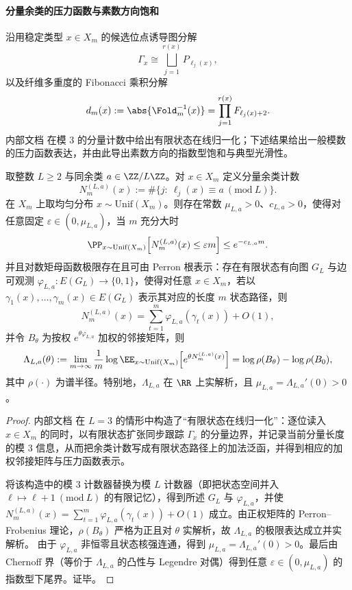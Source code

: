 \paragraph{分量余类的压力函数与素数方向饱和}
沿用稳定类型 \(x\in X_m\) 的候选位点诱导图分解
\[
\Gamma_x \cong \bigsqcup_{j=1}^{r(x)} P_{\ell_j(x)},
\]
以及纤维多重度的 Fibonacci 乘积分解
\[
d_m(x):=\abs{\Fold_m^{-1}(x)}=\prod_{j=1}^{r(x)} F_{\ell_j(x)+2}.
\]
内部文档 \cite{Internal2026FoldComponentResiduePressurePAdicSaturation20260302} 在模 \(3\) 的分量计数中给出有限状态在线归一化；下述结果给出一般模数的压力函数表达，并由此导出素数方向的指数型饱和与典型光滑性。

\begin{theorem}\label{thm:fold-component-residue-pressure-ld}
取整数 \(L\ge 2\) 与同余类 \(a\in \ZZ/L\ZZ\)。对 \(x\in X_m\) 定义分量余类计数
\[
N_{m}^{(L,a)}(x):=\#\{j:\ \ell_j(x)\equiv a\ (\mathrm{mod}\ L)\}.
\]
在 \(X_m\) 上取均匀分布 \(x\sim\mathrm{Unif}(X_m)\)。则存在常数 \(\mu_{L,a}>0\)、\(c_{L,a}>0\)，使得对任意固定 \(\varepsilon\in(0,\mu_{L,a})\)，当 \(m\) 充分大时
\[
\PP_{x\sim\mathrm{Unif}(X_m)}\!\left[N_{m}^{(L,a)}(x)\le \varepsilon m\right]\le e^{-c_{L,a}m}.
\]
并且对数矩母函数极限存在且可由 Perron 根表示：存在有限状态有向图 \(G_{L}\) 与边可观测 \(\varphi_{L,a}:E(G_L)\to\{0,1\}\)，使得对任意 \(x\in X_m\)，若以 \(\gamma_1(x),\dots,\gamma_m(x)\in E(G_L)\) 表示其对应的长度 \(m\) 状态路径，则
\[
N_{m}^{(L,a)}(x)=\sum_{t=1}^{m}\varphi_{L,a}(\gamma_t(x))+O(1),
\]
并令 \(B_{\theta}\) 为按权 \(e^{\theta\varphi_{L,a}}\) 加权的邻接矩阵，则
\[
\Lambda_{L,a}(\theta)
:=\lim_{m\to\infty}\frac1m\log \EE_{x\sim\mathrm{Unif}(X_m)}\!\left[e^{\theta N_m^{(L,a)}(x)}\right]
=\log \rho(B_{\theta})-\log \rho(B_{0}),
\]
其中 \(\rho(\cdot)\) 为谱半径。特别地，\(\Lambda_{L,a}\) 在 \(\RR\) 上实解析，且 \(\mu_{L,a}=\Lambda_{L,a}'(0)>0\)。
\end{theorem}
\begin{proof}
内部文档 \cite{Internal2026FoldComponentResiduePressurePAdicSaturation20260302} 在 \(L=3\) 的情形中构造了“有限状态在线归一化”：逐位读入 \(x\in X_m\) 的同时，以有限状态扩张同步跟踪 \(\Gamma_x\) 的分量边界，并记录当前分量长度的模 \(3\) 信息，从而把余类计数写成有限状态路径上的加法泛函，并得到相应的加权邻接矩阵与压力函数表示。

将该构造中的模 \(3\) 计数器替换为模 \(L\) 计数器（即把状态空间并入 \(\ell\mapsto \ell+1\ (\mathrm{mod}\ L)\) 的有限记忆），得到所述 \(G_L\) 与 \(\varphi_{L,a}\)，并使
\(
N_{m}^{(L,a)}(x)=\sum_{t=1}^{m}\varphi_{L,a}(\gamma_t(x))+O(1)
\)
成立。由正权矩阵的 Perron--Frobenius 理论，\(\rho(B_\theta)\) 严格为正且对 \(\theta\) 实解析，故 \(\Lambda_{L,a}\) 的极限表达成立并实解析。
由于 \(\varphi_{L,a}\) 非恒零且状态核强连通，得到 \(\mu_{L,a}=\Lambda_{L,a}'(0)>0\)。最后由 Chernoff 界（等价于 \(\Lambda_{L,a}\) 的凸性与 Legendre 对偶）得到任意 \(\varepsilon\in(0,\mu_{L,a})\) 的指数型下尾界。证毕。
\end{proof}

